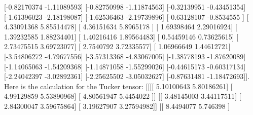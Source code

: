 \documentclass{article}%
\begin{document}
 {[}{-}0.82170374 {-}1.11089593{]}\newline%
 {[}{-}0.82750998 {-}1.11874563{]}\newline%
 {[}{-}0.32139951 {-}0.43451354{]}\newline%
 {[}{-}1.61396023 {-}2.18198087{]}\newline%
 {[}{-}1.62536463 {-}2.19739896{]}\newline%
 {[}{-}0.63128107 {-}0.8534555 {]}\newline%
 {[} 4.33091368  5.85514478{]}\newline%
 {[} 4.36151634  5.8965178 {]}\newline%
 {[} 1.69398464  2.29016924{]}\newline%
 {[} 1.39232585  1.88234401{]}\newline%
 {[} 1.40216416  1.89564483{]}\newline%
 {[} 0.54459146  0.73625615{]}\newline%
 {[} 2.73475515  3.69723077{]}\newline%
 {[} 2.7540792   3.72335577{]}\newline%
 {[} 1.06966649  1.44612721{]}\newline%
 {[}{-}3.54806272 {-}4.79677556{]}\newline%
 {[}{-}3.57313368 {-}4.83067005{]}\newline%
 {[}{-}1.38778193 {-}1.87620089{]}\newline%
 {[}{-}1.14065063 {-}1.54209368{]}\newline%
 {[}{-}1.14871058 {-}1.55299026{]}\newline%
 {[}{-}0.44615173 {-}0.60317134{]}\newline%
 {[}{-}2.24042397 {-}3.02892361{]}\newline%
 {[}{-}2.25625502 {-}3.05032627{]}\newline%
 {[}{-}0.87631481 {-}1.18472693{]}{]}.%
Here is the calculation for the Tucker tensor: {[}{[}{[}{[} 5.10100643  5.80186261{]}\newline%
   {[} 4.99129859  5.53890968{]}\newline%
   {[} 4.80561947  5.4454022 {]}{]}\newline%
\newline%
  {[}{[} 3.48145003  3.44117511{]}\newline%
   {[} 2.84300047  3.59675864{]}\newline%
   {[} 3.19627907  3.27594982{]}{]}\newline%
\newline%
  {[}{[} 8.4494077   5.746398  {]}\newline%
\end{document}

